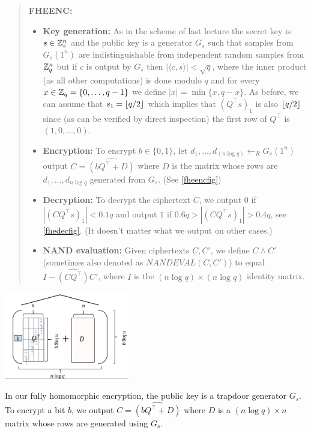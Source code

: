 \begin{quote}
\textbf{FHEENC:}

\begin{itemize}
\item
  \textbf{Key generation:} As in the scheme of last lecture the secret
  key is \(s\in{\mathbb{Z}}_s^n\) and the public key is a generator \(G_s\) such
  that samples from \(G_s(1^n)\) are indistinguishable from independent
  random samples from \({\mathbb{Z}}_q^n\) but if \(c\) is output by \(G_s\) then
  \(|\langle c,s \rangle|<\sqrt{q}\), where the inner product (as all
  other computations) is done modulo \(q\) and for every
  \(x\in{\mathbb{Z}}_q=\{0,\ldots,q-1\}\) we define \(|x|=\min \{ x, q-x \}\). As
  before, we can assume that \(s_1 = \lfloor q/2 \rfloor\) which implies that
  \((Q^\top s)_1\) is also \(\lfloor q/2 \rfloor\) since (as can be verified by
  direct inspection) the first row of \(Q^\top\) is \((1,0,\ldots,0)\).
\item
  \textbf{Encryption:} To encrypt \(b\in\{0,1\}\), let
  \(d_1,\ldots,d_(n\log q) \leftarrow_R G_s(1^n)\) output
  \(C=\widehat{(bQ^\top +D)}\) where \(D\) is the matrix whose rows are
  \(d_1,\ldots,d_{n\log q}\) generated from \(G_s\). (See
  \cref{fheencfig})
\item
  \textbf{Decryption:} To decrypt the ciphertext \(C\), we output \(0\)
  if \(|(\ensuremath{\mathit{CQ}}^\top s)_1|<0.1q\) and output \(1\) if
  \(0.6q>|(\ensuremath{\mathit{CQ}}^\top s)_1|>0.4q\), see
  \cref{fhedecfig}. (It doesn't matter what we output on other cases.)
\item
  \textbf{NAND evaluation:} Given ciphertexts \(C,C'\), we define
  \(C \overline{\wedge} C'\) (sometimes also denoted as
  \(\ensuremath{\mathit{NANDEVAL}}(C,C')\)) to equal
  \(I- \widehat{(\ensuremath{\mathit{CQ}}^\top)}C'\), where \(I\) is the
  \((n\log q)\times (n\log q)\) identity matrix.
\end{itemize}
\end{quote}



\begin{marginfigure}
\centering
\includegraphics[width=\linewidth, height=1.5in, keepaspectratio]{../figure/fheenc.png}
\caption{In our fully homomorphic encryption, the public key is a
trapdoor generator \(G_s\). To encrypt a bit \(b\), we output
\(C=\widehat{(bQ^\top +D)}\) where \(D\) is a \((n\log q) \times n\)
matrix whose rows are generated using \(G_s\).}
\label{fheencfig}
\end{marginfigure}


